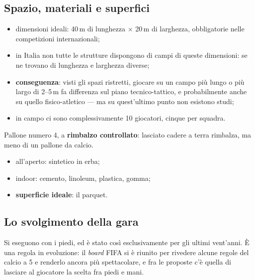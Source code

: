 \subsection{Spazio, materiali e superfici}

\begin{itemize}
  \item dimensioni ideali: 40\,m di lunghezza $\times$ 20\,m di larghezza, obbligatorie nelle
    competizioni internazionali;
  \item in Italia non tutte le strutture dispongono di campi di queste dimensioni: se ne trovano di
    lunghezza e larghezza diverse;
  \item \textbf{conseguenza}: visti gli spazi ristretti, giocare su un campo più lungo o più largo
    di 2--5\,m fa differenza sul piano tecnico-tattico, e probabilmente anche su quello
    fisico-atletico --- ma su quest'ultimo punto non esistono studi;
  \item in campo ci sono complessivamente 10 giocatori, cinque per squadra.
\end{itemize}

Pallone numero 4, a \textbf{rimbalzo controllato}: lasciato cadere a terra rimbalza, ma meno di un
pallone da calcio.

\begin{itemize}
  \item all'aperto: sintetico in erba;
  \item indoor: cemento, linoleum, plastica, gomma;
  \item \textbf{superficie ideale}: il parquet.
\end{itemize}

\subsection{Lo svolgimento della gara}

Si eseguono con i piedi, ed è stato così esclusivamente per gli ultimi vent'anni. È una regola in
evoluzione: il \textit{board} FIFA si è riunito per rivedere alcune regole del calcio a 5 e renderlo
ancora più spettacolare, e fra le proposte c'è quella di lasciare al giocatore la scelta fra piedi e
mani.

